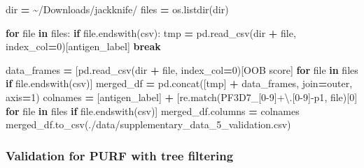 \documentclass[
  11pt,
  oneside]{book}
\newenvironment{Shaded}{\begin{snugshade}}{\end{snugshade}}
\newcommand{\BuiltInTok}[1]{#1}
\newcommand{\ControlFlowTok}[1]{\textcolor[rgb]{0.13,0.29,0.53}{\textbf{#1}}}
\newcommand{\DecValTok}[1]{\textcolor[rgb]{0.00,0.00,0.81}{#1}}
\newcommand{\KeywordTok}[1]{\textcolor[rgb]{0.13,0.29,0.53}{\textbf{#1}}}
\newcommand{\NormalTok}[1]{#1}
\newcommand{\OperatorTok}[1]{\textcolor[rgb]{0.81,0.36,0.00}{\textbf{#1}}}
\newcommand{\StringTok}[1]{\textcolor[rgb]{0.31,0.60,0.02}{#1}}
\begin{document}
\begin{Shaded}
\begin{Highlighting}[]
\BuiltInTok{dir} \OperatorTok{=} \StringTok{\textquotesingle{}\textasciitilde{}/Downloads/jackknife/\textquotesingle{}}
\NormalTok{files }\OperatorTok{=}\NormalTok{ os.listdir(}\BuiltInTok{dir}\NormalTok{)}

\ControlFlowTok{for} \BuiltInTok{file} \KeywordTok{in}\NormalTok{ files:}
    \ControlFlowTok{if} \BuiltInTok{file}\NormalTok{.endswith(}\StringTok{\textquotesingle{}csv\textquotesingle{}}\NormalTok{):}
\NormalTok{        tmp }\OperatorTok{=}\NormalTok{ pd.read\_csv(}\BuiltInTok{dir} \OperatorTok{+} \BuiltInTok{file}\NormalTok{, index\_col}\OperatorTok{=}\DecValTok{0}\NormalTok{)[}\StringTok{\textquotesingle{}antigen\_label\textquotesingle{}}\NormalTok{]}
        \ControlFlowTok{break}

\NormalTok{data\_frames }\OperatorTok{=}\NormalTok{ [pd.read\_csv(}\BuiltInTok{dir} \OperatorTok{+} \BuiltInTok{file}\NormalTok{, index\_col}\OperatorTok{=}\DecValTok{0}\NormalTok{)[}\StringTok{\textquotesingle{}OOB score\textquotesingle{}}\NormalTok{] }\ControlFlowTok{for} \BuiltInTok{file} \KeywordTok{in}\NormalTok{ files }\ControlFlowTok{if} \BuiltInTok{file}\NormalTok{.endswith(}\StringTok{\textquotesingle{}csv\textquotesingle{}}\NormalTok{)]}
\NormalTok{merged\_df }\OperatorTok{=}\NormalTok{ pd.concat([tmp] }\OperatorTok{+}\NormalTok{ data\_frames, join}\OperatorTok{=}\StringTok{\textquotesingle{}outer\textquotesingle{}}\NormalTok{, axis}\OperatorTok{=}\DecValTok{1}\NormalTok{)}
\NormalTok{colnames }\OperatorTok{=}\NormalTok{ [}\StringTok{\textquotesingle{}antigen\_label\textquotesingle{}}\NormalTok{] }\OperatorTok{+}\NormalTok{ [re.match(}\StringTok{\textquotesingle{}PF3D7\_[0{-}9]+\textbackslash{}.[0{-}9]{-}p1\textquotesingle{}}\NormalTok{, }\BuiltInTok{file}\NormalTok{)[}\DecValTok{0}\NormalTok{] }\ControlFlowTok{for} \BuiltInTok{file} \KeywordTok{in}\NormalTok{ files }\ControlFlowTok{if} \BuiltInTok{file}\NormalTok{.endswith(}\StringTok{\textquotesingle{}csv\textquotesingle{}}\NormalTok{)]}
\NormalTok{merged\_df.columns }\OperatorTok{=}\NormalTok{ colnames}
\NormalTok{merged\_df.to\_csv(}\StringTok{\textquotesingle{}./data/supplementary\_data\_5\_validation.csv\textquotesingle{}}\NormalTok{)}
\end{Highlighting}
\end{Shaded}

\hypertarget{validation-for-purf-with-tree-filtering}{%
\subsubsection{Validation for PURF with tree filtering}\label{validation-for-purf-with-tree-filtering}}
\end{document}
